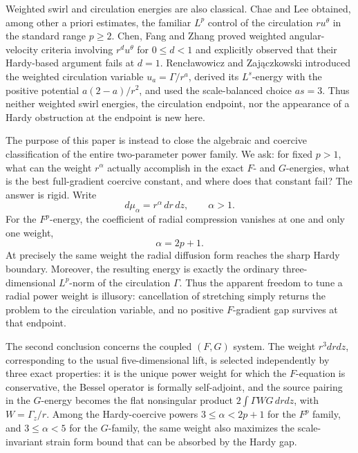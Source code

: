 \documentclass[11pt]{article}
\numberwithin{equation}{section}
\theoremstyle{remark}
\begin{document}
Weighted swirl and circulation energies are also classical.  Chae and Lee \cite{ChaeLee2002} obtained, among other a priori estimates, the familiar \(L^p\) control of the circulation \(ru^\theta\) in the standard range \(p\ge2\).  Chen, Fang and Zhang \cite{ChenFangZhang2017} proved weighted angular-velocity criteria involving \(r^d u^\theta\) for \(0\le d<1\) and explicitly observed that their Hardy-based argument fails at \(d=1\).  Renc\l awowicz and Zaj\k aczkowski \cite{RencZaj2019} introduced the weighted circulation variable \(u_a=\Gamma/r^a\), derived its \(L^s\)-energy with the positive potential \(a(2-a)/r^2\), and used the scale-balanced choice \(as=3\).  Thus neither weighted swirl energies, the circulation endpoint, nor the appearance of a Hardy obstruction at the endpoint is new here.

The purpose of this paper is instead to close the algebraic and coercive classification of the entire two-parameter power family.  We ask: for fixed \(p>1\), what can the weight \(r^\alpha\) actually accomplish in the exact \(F\)- and \(G\)-energies, what is the best full-gradient coercive constant, and where does that constant fail?  The answer is rigid.  Write
\[
 d\mu_\alpha=r^\alpha\,dr\,dz,\qquad \alpha>1.
\]
For the \(F^p\)-energy, the coefficient of radial compression vanishes at one and only one weight,
\[
 \alpha=2p+1.
\]
At precisely the same weight the radial diffusion form reaches the sharp Hardy boundary.  Moreover, the resulting energy is exactly the ordinary three-dimensional \(L^p\)-norm of the circulation \(\Gamma\).  Thus the apparent freedom to tune a radial power weight is illusory: cancellation of stretching simply returns the problem to the circulation variable, and no positive \(F\)-gradient gap survives at that endpoint.

The second conclusion concerns the coupled \((F,G)\) system.  The weight \(r^3drdz\), corresponding to the usual five-dimensional lift, is selected independently by three exact properties: it is the unique power weight for which the \(F\)-equation is conservative, the Bessel operator is formally self-adjoint, and the source pairing in the \(G\)-energy becomes the flat nonsingular product \(2\int \Gamma W G\,drdz\), with \(W=\Gamma_z/r\).  Among the Hardy-coercive powers \(3\le\alpha<2p+1\) for the \(F^p\) family, and \(3\le\alpha<5\) for the \(G\)-family, the same weight also maximizes the scale-invariant strain form bound that can be absorbed by the Hardy gap.
\end{document}
